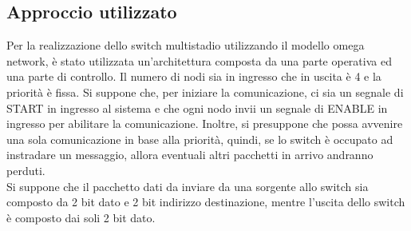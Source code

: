 \documentclass[12pt]{article}
\begin{document}
\subsection{Approccio utilizzato}
Per la realizzazione dello switch multistadio utilizzando il modello omega network, è stato utilizzata un’architettura composta da una parte operativa ed una parte di controllo. Il numero di nodi sia in ingresso che in uscita è 4 e la priorità è fissa. Si suppone che, per iniziare la comunicazione, ci sia un segnale di START in ingresso al sistema e che ogni nodo invii un segnale di ENABLE in ingresso per abilitare la comunicazione. Inoltre, si presuppone che possa avvenire una sola comunicazione in base alla priorità, quindi, se lo switch è occupato ad instradare un messaggio, allora eventuali altri pacchetti in arrivo andranno perduti.
\\Si suppone che il pacchetto dati da inviare da una sorgente allo switch sia composto da 2 bit dato e 2 bit indirizzo destinazione, mentre l’uscita dello switch è composto dai soli 2 bit dato.
\clearpage
\end{document}
